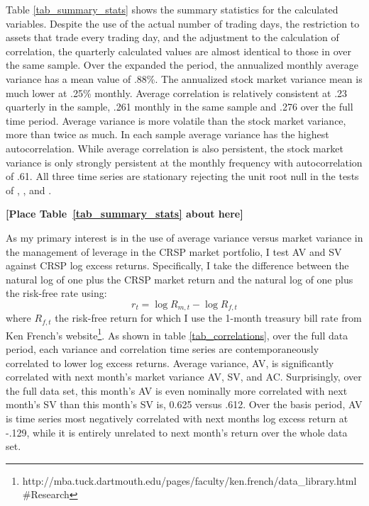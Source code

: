 Table \ref{tab_summary_stats} shows the summary statistics for the calculated variables. Despite the use of the actual number of trading days, the restriction to assets that trade every trading day, and the adjustment to the calculation of correlation, the quarterly calculated values are almost identical to those in \citet{pollet_average_2010} over the same sample. Over the expanded the period, the annualized monthly average variance has a mean value of .88\%. The annualized stock market variance mean is much lower at .25\% monthly. Average correlation is relatively consistent at .23 quarterly in the \cite{pollet_average_2010} sample, .261 monthly in the same sample and .276 over the full time period. Average variance is more volatile than the stock market variance, more than twice as much. In each sample average variance has the highest autocorrelation. While average correlation is also persistent, the stock market variance is only strongly persistent at the monthly frequency with autocorrelation of .61. All three time series are stationary rejecting the unit root null in the tests of \citet{dickey_distribution_1979}, \citet{Ng2001}, and \citet{ers1996}.\\
\bigskip
\centerline{\bf [Place Table~\ref{tab_summary_stats} about here]}
\bigskip
As my primary interest is in the use of average variance versus market variance in the management of leverage in the CRSP market portfolio, I test AV and SV against CRSP log excess returns.
Specifically, I take the difference between the natural log of one plus the CRSP market return and the natural log of one plus the risk-free rate using:
\begin{equation}
	r_{t} = \log R_{m,t} - \log R_{f,t} 
\end{equation}
where $R_{f,t}$ the risk-free return for which I use the 1-month treasury bill rate from Ken French's website\footnote{http://mba.tuck.dartmouth.edu/pages/faculty/ken.french/data\_library.html\#Research}. As shown in table \ref{tab_correlations}, over the full data period, each variance and correlation time series are contemporaneously correlated to lower log excess returns. Average variance, AV, is significantly correlated with next month's market variance AV, SV, and AC. Surprisingly, over the full data set, this month's AV is even nominally more correlated with next month's SV than this month's SV is, 0.625 versus .612. Over the basis period, AV is time series most negatively correlated with next months log excess return at -.129, while it is entirely unrelated to next month's return over the whole data set.

